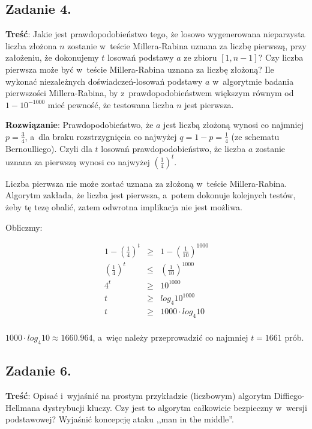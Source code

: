 \documentclass[a4paper,10pt, twocolumn]{article}
\begin{document}
\subsection{Zadanie 4.}

\textbf{Treść}: Jakie jest prawdopodobieństwo tego, że losowo wygenerowana nieparzysta liczba złożona $n$ zostanie w~teście Millera-Rabina uznana za liczbę pierwszą, przy założeniu, że dokonujemy $t$ losowań podstawy $a$ ze zbioru $[1, n-1]$? Czy liczba pierwsza może być w~teście Millera-Rabina uznana za liczbę złożoną? Ile wykonać niezależnych doświadczeń-losowań podstawy $a$ w~algorytmie badania pierwszości Millera-Rabina, by z~prawdopodobieństwem większym równym od $1 - 10^{-1000}$ mieć pewność, że testowana liczba $n$ jest pierwsza.

\textbf{Rozwiązanie}: Prawdopodobieństwo, że $a$ jest liczbą złożoną wynosi co najmniej $p = \frac{3}{4}$, a~dla braku rozstrzygnięcia co najwyżej $q = 1 - p = \frac{1}{4}$ (ze schematu Bernoulliego). Czyli dla $t$ losowań prawdopodobieństwo, że liczba $a$ zostanie uznana za pierwszą wynosi co najwyżej $(\frac{1}{4})^{t}$.

\noindent Liczba pierwsza nie może zostać uznana za złożoną w~teście Millera-Rabina. Algorytm zakłada, że liczba jest pierwsza, a~potem dokonuje kolejnych testów, żeby tę tezę obalić, zatem odwrotna implikacja nie jest możliwa. 

\noindent Obliczmy:

\begin{equation*}
	\begin{array}{lcl}
		1 - (\frac{1}{4})^{t} & \geq & 1 - (\frac{1}{10})^{1000} \\ 
		(\frac{1}{4})^{t} & \leq & (\frac{1}{10})^{1000} \\ 
		4^{t} & \geq & 10^{1000} \\
		t & \geq & log_{4}{10^{1000}} \\
		t & \geq & 1000 \cdot log_{4}{10} \\
	\end{array}
\end{equation*}

\noindent $1000 \cdot log_{4}{10} \approx 1660.964$, a~więc należy przeprowadzić co najmniej $t = 1661$ prób.

\subsection{Zadanie 6.}
\textbf{Treść}: Opisać i~wyjaśnić na prostym przykładzie (liczbowym) algorytm Diffiego-Hellmana dystrybucji kluczy. Czy jest to algorytm całkowicie bezpieczny w~wersji podstawowej? Wyjaśnić koncepcję ataku ,,man in the middle''.
\end{document}

